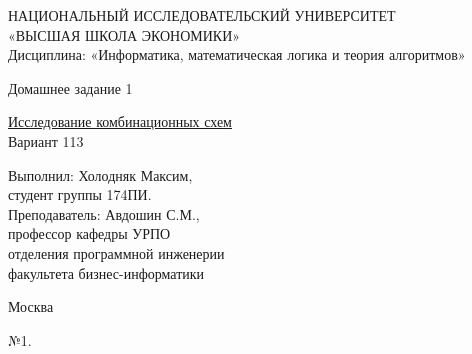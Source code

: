 \documentclass[a4paper,12pt]{report} %
\begin{document}
\begin{titlepage}
\newpage

\begin{center}
{\large НАЦИОНАЛЬНЫЙ ИССЛЕДОВАТЕЛЬСКИЙ УНИВЕРСИТЕТ \\
«ВЫСШАЯ ШКОЛА ЭКОНОМИКИ» 							\\
Дисциплина: «Информатика, математическая логика и теория алгоритмов»}

\vfill %

{\large Домашнее задание 1}

\bigskip

\underline{Исследование комбинационных схем}\\
Вариант 113

\vfill

\begin{flushright}
Выполнил: Холодняк Максим,\\
студент группы 174ПИ.\medskip \\
Преподаватель: Авдошин С.М.,\\
профессор кафедры УРПО \\
отделения программной инженерии \\
факультета бизнес-информатики \\
\end{flushright}

\vfill

Москва \number\year

\end{center}
\end{titlepage}

\newpage

\begin{center}
№1.\\
\end{center}
\end{document}
